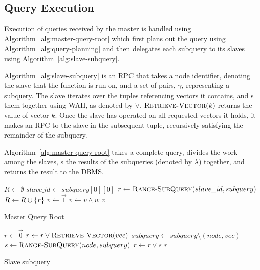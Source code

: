 \subsection{Query Execution}
Execution of queries received by the master is handled using
Algorithm~\ref{alg:master-query-root} which first plans out the query using
Algorithm~\ref{alg:query-planning} and then delegates each subquery to its
slaves using Algorithm~\ref{alg:slave-subquery}.
\par
Algorithm~\ref{alg:slave-subquery} is an RPC that takes a node identifier,
denoting the slave that the function is run on, and a set of pairs, \(\gamma\),
representing a subquery. The slave iterates over the tuples referencing vectors
it contains, and s them together using WAH, as denoted by \(\lor\).
\(\mathrm{\textsc{Retrieve-Vector}}(k)\) returns the value of vector \(k\).
Once the slave has operated on all requested vectors it holds, it makes an RPC
to the slave in the subsequent tuple, recursively satisfying the remainder of
the subquery.
\par
Algorithm~\ref{alg:master-query-root} takes a complete query, divides the work
among the slaves, s the results of the subqueries (denoted by
\(\lambda\)) together, and returns the result to the DBMS.
%
\begin{algorithm}
    \begin{algorithmic}
            \State $R \gets \emptyset$
                \State $slave\_id \gets subquery[0][0]$
                \State $r \gets \Call{Range-SubQuery}{slave\_id, subquery}$
                \State $R \gets R \cup \left\{r\right\}$
            \EndFor
            \State $v \gets \vec{1}$
                \State $v \gets v \land w$
            \EndFor
            \State \Return $v$
        \EndProcedure
    \end{algorithmic}
    \caption{Master Query Root}
    \label{alg:master-query-root}
\end{algorithm}
%
\begin{algorithm}
    \begin{algorithmic}
            \State $r \gets \vec{0}$
                 
                    \State $r \gets r \lor \Call{Retrieve-Vector}{vec}$
                    \State $subquery \gets subquery \setminus (node, vec)$
                \Else {}
                    \State $s \gets \Call{Range-SubQuery}{node, subquery}$
                    \State $r \gets r \lor s$
                \EndIf
            \EndFor
            \State \Return $r$
        \EndProcedure
    \end{algorithmic}
    \caption{Slave subquery}
    \label{alg:slave-subquery}
\end{algorithm}
%
